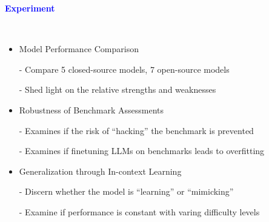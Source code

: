 \documentclass[professionalfont]{beamer}
\begin{document}
\begin{frame}
\begin{center}
    { \textbf{\textcolor{blue}{ {\fontsize{12}{14}\selectfont Experiment} }} }
\end{center}
\\[0.5cm]

{\fontsize{10}{14}\selectfont 
\begin{itemize}
    \item Model Performance Comparison

    - Compare 5 closed-source models, 7 open-source models

    - Shed light on the relative strengths and weaknesses

    \item Robustness of Benchmark Assessments

    - Examines if the risk of “hacking” the benchmark is prevented

    - Examines if finetuning LLMs on benchmarks leads to overfitting

    \item Generalization through In-context Learning
    
    - Discern whether the model is “learning” or “mimicking”

    - Examine if performance is constant with varing difficulty levels
\end{itemize}
}

\end{frame}
\end{document}
